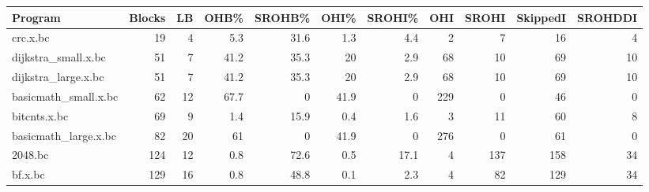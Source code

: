\begin{tabular}{lrrrrrrrrrr}
\hline
 Program              &   Blocks &   LB &   OHB\% &   SROHB\% &   OHI\% &   SROHI\% &   OHI &   SROHI &   SkippedI &   SROHDDI \\
\hline
 crc.x.bc             &       19 &    4 &    5.3 &     31.6 &    1.3 &      4.4 &     2 &       7 &         16 &         4 \\
 dijkstra\_small.x.bc  &       51 &    7 &   41.2 &     35.3 &   20   &      2.9 &    68 &      10 &         69 &        10 \\
 dijkstra\_large.x.bc  &       51 &    7 &   41.2 &     35.3 &   20   &      2.9 &    68 &      10 &         69 &        10 \\
 basicmath\_small.x.bc &       62 &   12 &   67.7 &      0   &   41.9 &      0   &   229 &       0 &         46 &         0 \\
 bitcnts.x.bc         &       69 &    9 &    1.4 &     15.9 &    0.4 &      1.6 &     3 &      11 &         60 &         8 \\
 basicmath\_large.x.bc &       82 &   20 &   61   &      0   &   41.9 &      0   &   276 &       0 &         61 &         0 \\
 2048.bc              &      124 &   12 &    0.8 &     72.6 &    0.5 &     17.1 &     4 &     137 &        158 &        34 \\
 bf.x.bc              &      129 &   16 &    0.8 &     48.8 &    0.1 &      2.3 &     4 &      82 &        129 &        34 \\
\hline
\end{tabular}